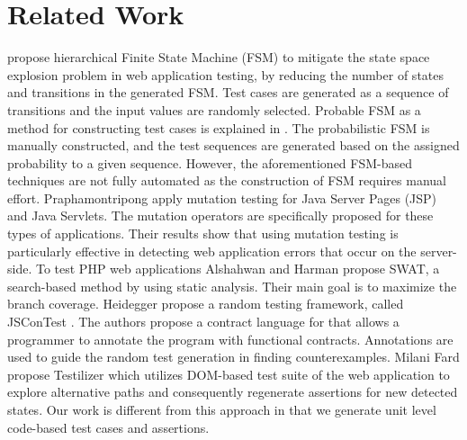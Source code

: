 \section{Related Work} \label{Sec:related}
\cite{20} propose hierarchical Finite State Machine (FSM) to mitigate the state space explosion problem in web application testing, by reducing the number of states and transitions in the generated FSM. Test cases are generated as a sequence of transitions and the input values are randomly selected.
Probable FSM as a method for constructing test cases is explained in \cite{21}. The probabilistic FSM is manually constructed, and the test sequences are generated based on the assigned probability to a given sequence. However, the aforementioned FSM-based techniques are not fully automated as the construction of FSM requires manual effort.
Praphamontripong \etal \cite{22} apply mutation testing for Java Server Pages (JSP) and Java Servlets. The mutation operators are specifically proposed for these types of applications. Their results show that using mutation testing is particularly effective in detecting web application errors that occur on the server-side.
To test PHP web applications Alshahwan and Harman \cite{23} propose SWAT, a search-based method by using static analysis. Their main goal is to maximize the branch coverage.
Heidegger \etal propose a random testing framework, called JSConTest \cite{30}. The authors propose a contract language for \javascript that allows a programmer to annotate the program with functional contracts. Annotations are used to guide the random test generation in finding counterexamples.
Milani Fard \etal \cite{milanifard:ase14} propose Testilizer which utilizes DOM-based test suite of the web application to explore alternative paths and consequently regenerate assertions for new detected states. Our work is different from this approach in that we generate unit level code-based test cases and assertions.


